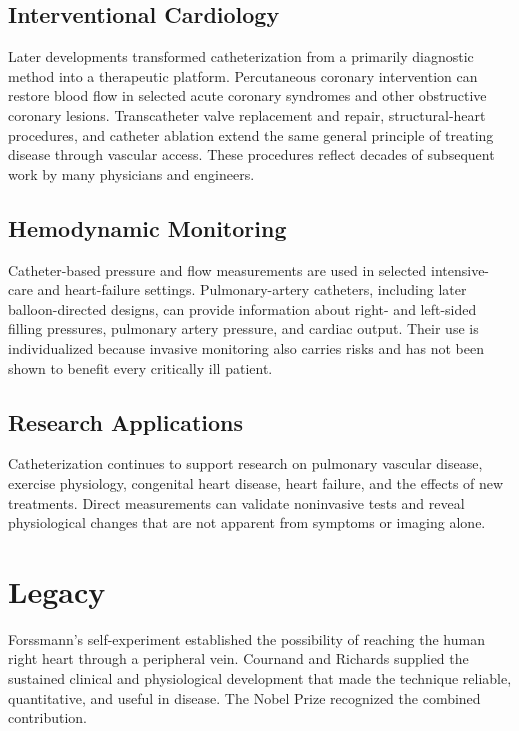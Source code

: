 \subsection{Interventional Cardiology}

Later developments transformed catheterization from a primarily diagnostic method into a therapeutic platform. Percutaneous coronary intervention can restore blood flow in selected acute coronary syndromes and other obstructive coronary lesions. Transcatheter valve replacement and repair, structural-heart procedures, and catheter ablation extend the same general principle of treating disease through vascular access. These procedures reflect decades of subsequent work by many physicians and engineers.

\subsection{Hemodynamic Monitoring}

Catheter-based pressure and flow measurements are used in selected intensive-care and heart-failure settings. Pulmonary-artery catheters, including later balloon-directed designs, can provide information about right- and left-sided filling pressures, pulmonary artery pressure, and cardiac output. Their use is individualized because invasive monitoring also carries risks and has not been shown to benefit every critically ill patient.

\subsection{Research Applications}

Catheterization continues to support research on pulmonary vascular disease, exercise physiology, congenital heart disease, heart failure, and the effects of new treatments. Direct measurements can validate noninvasive tests and reveal physiological changes that are not apparent from symptoms or imaging alone.

\section{Legacy}

Forssmann's self-experiment established the possibility of reaching the human right heart through a peripheral vein. Cournand and Richards supplied the sustained clinical and physiological development that made the technique reliable, quantitative, and useful in disease. The Nobel Prize recognized the combined contribution.

